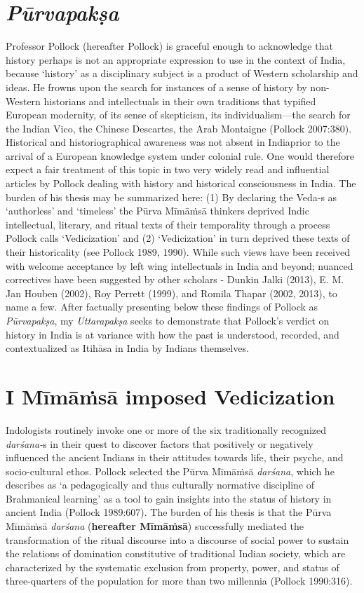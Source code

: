 \section*{\textit{Pūrvapakṣa}}

Professor Pollock (hereafter Pollock) is graceful enough to acknowledge that history perhaps is not an appropriate expression to use in the context of India, because ‘history’ as a disciplinary subject is a product of Western scholarship and ideas. He frowns upon the search for instances of a sense of history by non-Western historians and intellectuals in their own traditions that typified European modernity, of its sense of skepticism, its individualism—the search for the Indian Vico, the Chinese Descartes, the Arab Montaigne (Pollock 2007:380). Historical and historiographical awareness was not absent in India\break prior to the arrival of a European knowledge system under colonial rule. One would therefore expect a fair treatment of this topic in two very widely read and influential articles by Pollock dealing with history and historical consciousness in India. The burden of his thesis may be summarized here: (1) By declaring the Veda-s as ‘authorless’ and ‘timeless’ the Pūrva Mīmāṁsā thinkers deprived Indic intellectual, literary, and ritual texts of their temporality through a process Pollock calls ‘Vedicization’ and (2) ‘Vedicization’ in turn deprived these texts of their historicality (see Pollock 1989, 1990). While such views have been received with welcome acceptance by left wing intellectuals in India and beyond; nuanced correctives have been suggested by other scholars - Dunkin Jalki (2013), E. M. Jan Houben (2002), Roy Perrett (1999), and Romila Thapar (2002, 2013), to name a few. After factually presenting below these findings of Pollock as \textit{Pūrvapakṣa}, my \textit{Uttarapakṣa} seeks to demonstrate that Pollock’s verdict on history in India is at variance with how the past is understood, recorded, and contextualized as Itihāsa in India by Indians themselves.


\section*{I Mīmāṁsā imposed Vedicization}

Indologists routinely invoke one or more of the six traditionally recognized \textit{darśana-}s in their quest to discover factors that positively or negatively influenced the ancient Indians in their attitudes towards life, their psyche, and socio-cultural ethos. Pollock selected the Pūrva Mīmāṁsā \textit{darśana}, which he describes as ‘a pedagogically and thus culturally normative discipline of Brahmanical learning’ as a tool to gain insights into the status of history in ancient India (Pollock 1989:607). The burden of his thesis is that the Pūrva Mīmāṁsā \textit{darśana} (\textbf{hereafter Mīmāṁsā}) successfully mediated the transformation of the ritual discourse into a discourse of social power to sustain the relations of domination constitutive of traditional Indian society, which are characterized by the systematic exclusion from property, power, and status of three-quarters of the population for more than two millennia (Pollock 1990:316).

